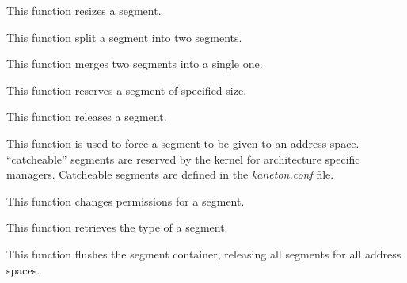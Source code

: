 This function resizes a segment.


This function split a segment into two segments.


This function merges two segments into a single one.


This function reserves a segment of specified size.


This function releases a segment.


This function  is used to  force a segment  to be given to  an address
space.  ``catcheable''  segments  are   reserved  by  the  kernel  for
architecture specific managers. Catcheable segments are defined in the
\textit{kaneton.conf} file.


This function changes permissions for a segment.


This function retrieves the type of a segment.


This function  flushes the  segment container, releasing  all segments
for all address spaces.

